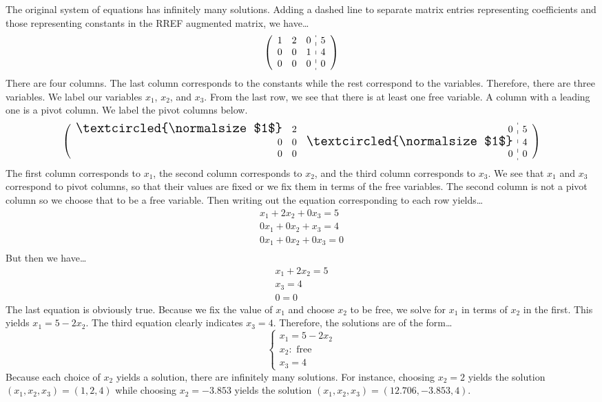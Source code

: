 \documentclass[12pt,letterpaper]{exam}
\begin{document}
\begin{questions}
\sol The original system of equations has infinitely many solutions. Adding a dashed line to separate matrix entries representing coefficients and those representing constants in the RREF augmented matrix, we have\dots
	\[
	\left(
	\begin{array}{rrr:r}
	1 & 2 & 0 & 5 \\
	0 & 0 & 1 & 4 \\
	0 & 0 & 0 & 0 
	\end{array} 
	\right)
	\]
There are four columns. The last column corresponds to the constants while the rest correspond to the variables. Therefore, there are three variables. We label our variables $x_1$, $x_2$, and $x_3$. From the last row, we see that there is at least one free variable. A column with a leading one is a pivot column. We label the pivot columns below. 
	\[
	\left(
	\begin{array}{rrr:r}
	{\Large \textcircled{\normalsize $1$}} & 2 & 0 & 5 \\
	0 & 0 & {\Large \textcircled{\normalsize $1$}} & 4 \\
	0 & 0 & 0 & 0 
	\end{array} 
	\right)
	\]
The first column corresponds to $x_1$, the second column corresponds to $x_2$, and the third column corresponds to $x_3$. We see that $x_1$ and $x_3$ correspond to pivot columns, so that their values are fixed or we fix them in terms of the free variables. The second column is not a pivot column so we choose that to be a free variable. Then writing out the equation corresponding to each row yields\dots
	\[
	\begin{gathered}
	x_1 + 2x_2 + 0x_3= 5 \\
	0x_1 + 0x_2 + x_3= 4 \\
	0x_1 + 0x_2 + 0x_3= 0 \\
	\end{gathered}
	\]
But then we have\dots
	\[
	\begin{gathered}
	x_1 + 2x_2= 5 \\
	x_3= 4 \\
	0= 0 
	\end{gathered}
	\]
The last equation is obviously true. Because we fix the value of $x_1$ and choose $x_2$ to be free, we solve for $x_1$ in terms of $x_2$ in the first. This yields $x_1= 5 - 2x_2$. The third equation clearly indicates $x_3= 4$. Therefore, the solutions are of the form\dots
	\[
	\begin{cases}
	x_1= 5 - 2x_2 \\ 
	x_2 \colon \text{ free} \\
	x_3= 4
	\end{cases}
	\]
Because each choice of $x_2$ yields a solution, there are infinitely many solutions. For instance, choosing $x_2= 2$ yields the solution $(x_1, x_2, x_3)= (1, 2, 4)$ while choosing $x_2= -3.853$ yields the solution $(x_1, x_2, x_3)= (12.706, -3.853, 4)$. 




\end{questions}
\end{document}
